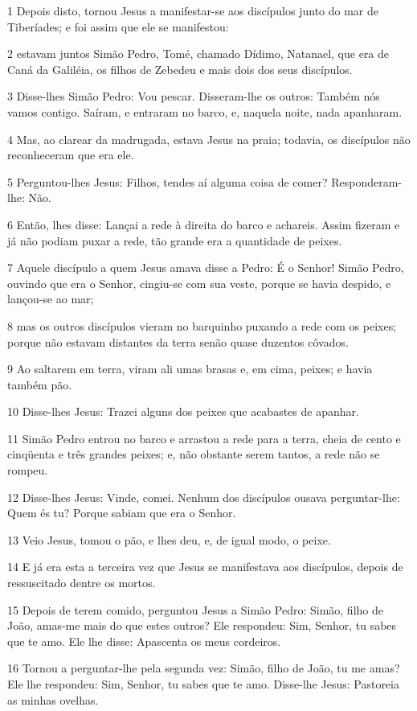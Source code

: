 \par 1 Depois disto, tornou Jesus a manifestar-se aos discípulos junto do mar de Tiberíades; e foi assim que ele se manifestou:
\par 2 estavam juntos Simão Pedro, Tomé, chamado Dídimo, Natanael, que era de Caná da Galiléia, os filhos de Zebedeu e mais dois dos seus discípulos.
\par 3 Disse-lhes Simão Pedro: Vou pescar. Disseram-lhe os outros: Também nós vamos contigo. Saíram, e entraram no barco, e, naquela noite, nada apanharam.
\par 4 Mas, ao clarear da madrugada, estava Jesus na praia; todavia, os discípulos não reconheceram que era ele.
\par 5 Perguntou-lhes Jesus: Filhos, tendes aí alguma coisa de comer? Responderam-lhe: Não.
\par 6 Então, lhes disse: Lançai a rede à direita do barco e achareis. Assim fizeram e já não podiam puxar a rede, tão grande era a quantidade de peixes.
\par 7 Aquele discípulo a quem Jesus amava disse a Pedro: É o Senhor! Simão Pedro, ouvindo que era o Senhor, cingiu-se com sua veste, porque se havia despido, e lançou-se ao mar;
\par 8 mas os outros discípulos vieram no barquinho puxando a rede com os peixes; porque não estavam distantes da terra senão quase duzentos côvados.
\par 9 Ao saltarem em terra, viram ali umas brasas e, em cima, peixes; e havia também pão.
\par 10 Disse-lhes Jesus: Trazei alguns dos peixes que acabastes de apanhar.
\par 11 Simão Pedro entrou no barco e arrastou a rede para a terra, cheia de cento e cinqüenta e três grandes peixes; e, não obstante serem tantos, a rede não se rompeu.
\par 12 Disse-lhes Jesus: Vinde, comei. Nenhum dos discípulos ousava perguntar-lhe: Quem és tu? Porque sabiam que era o Senhor.
\par 13 Veio Jesus, tomou o pão, e lhes deu, e, de igual modo, o peixe.
\par 14 E já era esta a terceira vez que Jesus se manifestava aos discípulos, depois de ressuscitado dentre os mortos.
\par 15 Depois de terem comido, perguntou Jesus a Simão Pedro: Simão, filho de João, amas-me mais do que estes outros? Ele respondeu: Sim, Senhor, tu sabes que te amo. Ele lhe disse: Apascenta os meus cordeiros.
\par 16 Tornou a perguntar-lhe pela segunda vez: Simão, filho de João, tu me amas? Ele lhe respondeu: Sim, Senhor, tu sabes que te amo. Disse-lhe Jesus: Pastoreia as minhas ovelhas.

